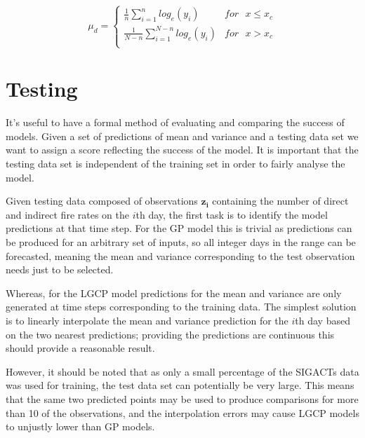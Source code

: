 \documentclass[a4paper,11pt]{report}
\begin{document}
\begin{equation} \label{eq:cpmeaneq}
\mu_d = \begin{cases}
\frac{1}{n} \displaystyle \sum_{i=1}^{n} log_e(y_i) & for \text{ } x \leq x_c \\
\frac{1}{N-n} \displaystyle \sum_{i=1}^{N-n} log_e(y_i) & for \text{ } x > x_c \\ 
\end{cases}
\end{equation}


\chapter{Testing}


It's useful to have a formal method of evaluating and comparing the success of models. Given a set of predictions of mean and variance and a testing data set we want to assign a score reflecting the success of the model. It is important that the testing data set is independent of the training set in order to fairly analyse the model.

Given testing data composed of observations \(\mathbf{z_i}\) containing the number of direct and indirect fire rates on the \(i\)th day, the first task is to identify the model predictions at that time step. For the GP model this is trivial as predictions can be produced for an arbitrary set of inputs, so all integer days in the range can be forecasted, meaning the mean and variance corresponding to the test observation needs just to be selected. 

Whereas, for the LGCP model predictions for the mean and variance are only generated at time steps corresponding to the training data. The simplest solution is to linearly interpolate the mean and variance prediction for the \(i\)th day based on the two nearest predictions; providing the predictions are continuous this should provide a reasonable result. 

However, it should be noted that as only a small percentage of the SIGACTs data was used for training, the test data set can potentially be very large. This means that the same two predicted points may be used to produce comparisons for more than 10 of the observations, and the interpolation errors may cause LGCP models to unjustly lower than GP models.

\end{document}
